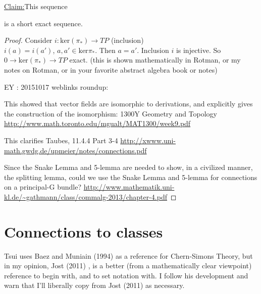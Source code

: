 \documentclass[10pt]{amsart}
\newenvironment{claim}[1]{\par\noindent\underline{Claim:}\space#1}{}
\begin{document}
\begin{multicols*}{2}
\begin{claim}
This sequence
is a short exact sequence.
\end{claim}

\begin{proof}
  Consider $i : \text{ker}(\pi_*) \to TP$ (inclusion) \\
$i(a) = i(a')$, $a, a' \in \text{ker}\pi_*$.  Then $a=a'$.  Inclusion $i$ is injective.  So $0 \to \text{ker}(\pi_*) \to TP$ exact.  (this is shown mathematically in Rotman, or my notes on Rotman, or in your favorite abstract algebra book or notes) 

EY : 20151017 weblinks roundup:

This showed that vector fields are isomorphic to derivations, and explicitly gives the construction of the isomorphism: 1300Y Geometry and Topology \url{http://www.math.toronto.edu/mgualt/MAT1300/week9.pdf}

This clarifies Taubes, 11.4.4 Part 3-4 \url{http://xwww.uni-math.gwdg.de/upmeier/notes/connections.pdf}

Since the Snake Lemma and 5-lemma are needed to show, in a civilized manner, the splitting lemma, could we use the Snake Lemma and 5-lemma for connections on a principal-G bundle? \url{http://www.mathematik.uni-kl.de/~gathmann/class/commalg-2013/chapter-4.pdf}

\end{proof}

\section{Connections to classes}

Tsui \cite{LTsui} uses Baez and Muniain (1994) \cite{JBaezJMuniain1994} as a reference for Chern-Simons Theory, but in my opinion, Jost (2011) \cite{JJost2011}, is a better (from a mathematically clear viewpoint) reference to begin with, and to set notation with.  I follow his development and warn that I'll liberally copy from Jost (2011) \cite{JJost2011} as necessary.  


\end{multicols*}
\end{document}
